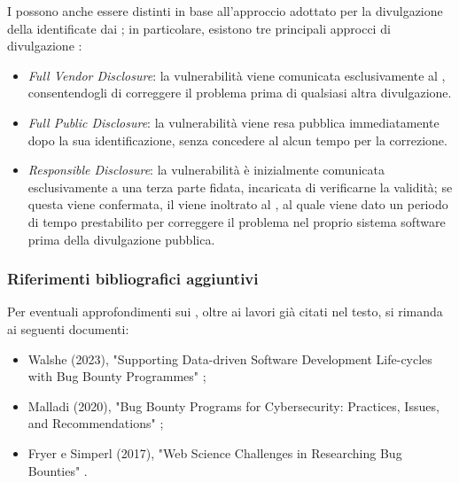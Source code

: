 I \BBP possono anche essere distinti in base all'approccio adottato per la divulgazione della \vulnerability identificate dai \BH; in particolare, esistono tre principali approcci di divulgazione \cite{lisi2022ard}:
\begin{itemize}

\item \emph{Full Vendor Disclosure}: la vulnerabilità viene comunicata esclusivamente al \BI, consentendogli di correggere il problema prima di qualsiasi altra divulgazione.

\item \emph{Full Public Disclosure}: la vulnerabilità viene resa pubblica immediatamente dopo la sua identificazione, senza concedere al \BI alcun tempo per la correzione.

\item \emph{Responsible Disclosure}: la vulnerabilità è inizialmente comunicata esclusivamente a una terza parte fidata, incaricata di verificarne la validità; se questa viene confermata, il \bugreport viene inoltrato al \BI, al quale viene dato un periodo di tempo prestabilito per correggere il problema nel proprio sistema software prima della divulgazione pubblica.
\end{itemize}


\subsubsection{Riferimenti bibliografici aggiuntivi}

Per eventuali approfondimenti sui \BBP, oltre ai lavori già citati nel testo, si rimanda ai seguenti documenti: 
\begin{itemize}

\item Walshe (2023), "Supporting Data-driven Software Development Life-cycles with Bug Bounty Programmes" \cite{walshe2023bountythesis};

\item Malladi \etAl (2020), "Bug Bounty Programs for Cybersecurity: Practices, Issues, and Recommendations" \cite{malladi2020bugbounty};

\item Fryer e Simperl (2017), "Web Science Challenges in Researching Bug Bounties" \cite{fryer2017bugbounty}.

\end{itemize}


